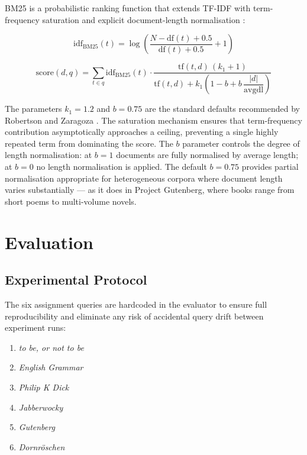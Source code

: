 \documentclass[sigconf]{acmart}
\begin{document}
BM25 is a probabilistic ranking function that extends TF-IDF with term-frequency saturation and explicit document-length normalisation \cite{robertson2009}:

\begin{equation}
\mathrm{idf}_{\mathrm{BM25}}(t) = \log\!\left(\frac{N - \mathrm{df}(t) + 0.5}{\mathrm{df}(t) + 0.5} + 1\right)
\end{equation}

\begin{equation}
\mathrm{score}(d,q) = \sum_{t \in q} \mathrm{idf}_{\mathrm{BM25}}(t) \cdot
\frac{\mathrm{tf}(t,d)\,(k_1+1)}{\mathrm{tf}(t,d) + k_1\!\left(1 - b + b\,\dfrac{|d|}{\mathrm{avgdl}}\right)}
\end{equation}

The parameters $k_1 = 1.2$ and $b = 0.75$ are the standard defaults recommended by Robertson and Zaragoza \cite{robertson2009}. The saturation mechanism ensures that term-frequency contribution asymptotically approaches a ceiling, preventing a single highly repeated term from dominating the score. The $b$ parameter controls the degree of length normalisation: at $b = 1$ documents are fully normalised by average length; at $b = 0$ no length normalisation is applied. The default $b = 0.75$ provides partial normalisation appropriate for heterogeneous corpora where document length varies substantially --- as it does in Project Gutenberg, where books range from short poems to multi-volume novels.

\section{Evaluation}

\subsection{Experimental Protocol}

The six assignment queries are hardcoded in the evaluator to ensure full reproducibility and eliminate any risk of accidental query drift between experiment runs:

\begin{enumerate}
    \item \emph{to be, or not to be}
    \item \emph{English Grammar}
    \item \emph{Philip K Dick}
    \item \emph{Jabberwocky}
    \item \emph{Gutenberg}
    \item \emph{Dornr\"{o}schen}
\end{enumerate}
\end{document}
